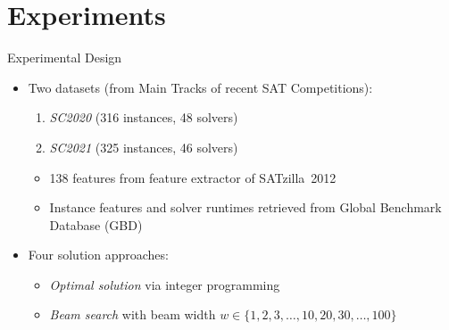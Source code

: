 \documentclass[en]{sdqbeamer}
\begin{document}
\section{Experiments}

\begin{frame}[t]{Experimental Design}
	\begin{itemize}
		\item Two datasets (from Main Tracks of recent SAT Competitions):
		\begin{enumerate}[1)]
			\item \emph{SC2020} (316 instances, 48 solvers)~\cite{balyo2020proceedings}
			\item \emph{SC2021} (325 instances, 46 solvers)~\cite{balyo2021proceedings}
		\end{enumerate}
		\begin{itemize}
			\item 138 features from feature extractor of SATzilla~2012~\cite{xu2012features, xu2012satzilla2012}
			\item Instance features and solver runtimes retrieved from Global Benchmark Database (GBD)~\cite{iser2020collaborative}
		\end{itemize}
		\pause
		\vspace{\baselineskip}
		\item Four solution approaches:
		\begin{itemize}
			\item \emph{Optimal solution} via integer programming~\cite{python-mip}
			\item \emph{Beam search} with beam width $w \in \{1, 2, 3, \dots, 10, 20, 30, \dots, 100\}$

\end{itemize}
\end{itemize}
\end{frame}
\end{document}
